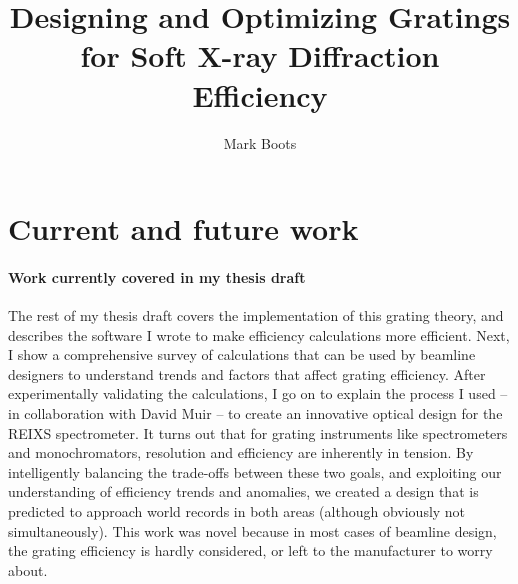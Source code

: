 \documentclass[singlespace,proposal]{uofsthesis-cs}
\title{Designing and Optimizing Gratings for Soft X-ray Diffraction Efficiency}
\author{Mark Boots}
\begin{document}
\maketitle

\frontmatter



%



\titlespacing{\chapter}{0pt}{-30pt}{20pt}
\chapter{Current and future work}
\subsubsection{Work currently covered in my thesis draft}
The rest of my thesis draft covers the implementation of this grating theory, and describes the software I wrote to make efficiency calculations more efficient.  Next, I show a comprehensive survey of calculations that can be used by beamline designers to understand trends and factors that affect grating efficiency.  After experimentally validating the calculations, I go on to explain the process I used -- in collaboration with David Muir -- to create an innovative optical design for the REIXS spectrometer.  It turns out that for grating instruments like spectrometers and monochromators, resolution and efficiency are inherently in tension.  By intelligently balancing the trade-offs between these two goals, and exploiting our understanding of efficiency trends and anomalies, we created a design that is predicted to approach world records in both areas (although obviously not simultaneously).  This work was novel because in most cases of beamline design, the grating efficiency is hardly considered, or left to the manufacturer to worry about.
\end{document}
